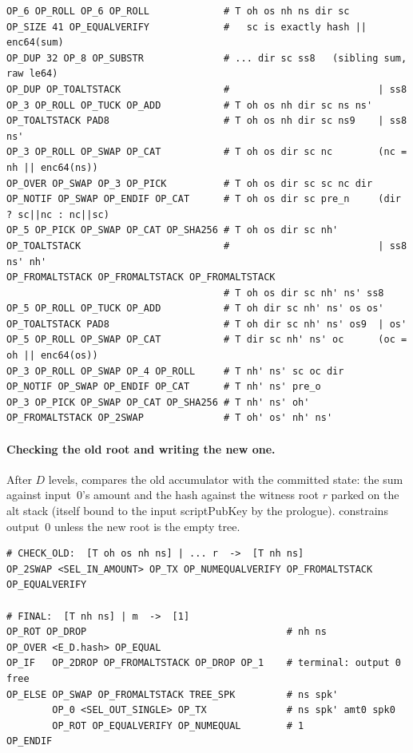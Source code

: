 \begin{lstlisting}
OP_6 OP_ROLL OP_6 OP_ROLL             # T oh os nh ns dir sc
OP_SIZE 41 OP_EQUALVERIFY             #   sc is exactly hash || enc64(sum)
OP_DUP 32 OP_8 OP_SUBSTR              # ... dir sc ss8   (sibling sum, raw le64)
OP_DUP OP_TOALTSTACK                  #                          | ss8
OP_3 OP_ROLL OP_TUCK OP_ADD           # T oh os nh dir sc ns ns'
OP_TOALTSTACK PAD8                    # T oh os nh dir sc ns9    | ss8 ns'
OP_3 OP_ROLL OP_SWAP OP_CAT           # T oh os dir sc nc        (nc = nh || enc64(ns))
OP_OVER OP_SWAP OP_3 OP_PICK          # T oh os dir sc sc nc dir
OP_NOTIF OP_SWAP OP_ENDIF OP_CAT      # T oh os dir sc pre_n     (dir ? sc||nc : nc||sc)
OP_5 OP_PICK OP_SWAP OP_CAT OP_SHA256 # T oh os dir sc nh'
OP_TOALTSTACK                         #                          | ss8 ns' nh'
OP_FROMALTSTACK OP_FROMALTSTACK OP_FROMALTSTACK
                                      # T oh os dir sc nh' ns' ss8
OP_5 OP_ROLL OP_TUCK OP_ADD           # T oh dir sc nh' ns' os os'
OP_TOALTSTACK PAD8                    # T oh dir sc nh' ns' os9  | os'
OP_5 OP_ROLL OP_SWAP OP_CAT           # T dir sc nh' ns' oc      (oc = oh || enc64(os))
OP_3 OP_ROLL OP_SWAP OP_4 OP_ROLL     # T nh' ns' sc oc dir
OP_NOTIF OP_SWAP OP_ENDIF OP_CAT      # T nh' ns' pre_o
OP_3 OP_PICK OP_SWAP OP_CAT OP_SHA256 # T nh' ns' oh'
OP_FROMALTSTACK OP_2SWAP              # T oh' os' nh' ns'
\end{lstlisting}

\paragraph{Checking the old root and writing the new one.}
After $D$ levels,  compares the old accumulator with the
committed state: the sum against input~0's amount and the hash against
the witness root $r$ parked on the alt stack (itself bound to the input
scriptPubKey by the prologue).  constrains output~0 unless the
new root is the empty tree.

\begin{lstlisting}
# CHECK_OLD:  [T oh os nh ns] | ... r  ->  [T nh ns]
OP_2SWAP <SEL_IN_AMOUNT> OP_TX OP_NUMEQUALVERIFY OP_FROMALTSTACK OP_EQUALVERIFY

# FINAL:  [T nh ns] | m  ->  [1]
OP_ROT OP_DROP                                   # nh ns
OP_OVER <E_D.hash> OP_EQUAL
OP_IF   OP_2DROP OP_FROMALTSTACK OP_DROP OP_1    # terminal: output 0 free
OP_ELSE OP_SWAP OP_FROMALTSTACK TREE_SPK         # ns spk'
        OP_0 <SEL_OUT_SINGLE> OP_TX              # ns spk' amt0 spk0
        OP_ROT OP_EQUALVERIFY OP_NUMEQUAL        # 1
OP_ENDIF
\end{lstlisting}

